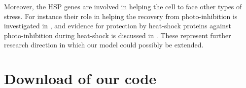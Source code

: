 \documentclass[oneside, 10pt, a4paper, twocolumn]{article}
\begin{document}


Moreover, the HSP genes are involved in helping the cell to face other types of stress. For instance their role in helping the recovery from photo-inhibition is investigated in \cite{Schroda1999}, and evidence for protection by heat-shock proteins against photo-inhibition during heat-shock is discussed in \cite{Schuster1988}. %
These represent further research direction in which our model could possibly be extended.




\section*{Download of our code}
\end{document}
